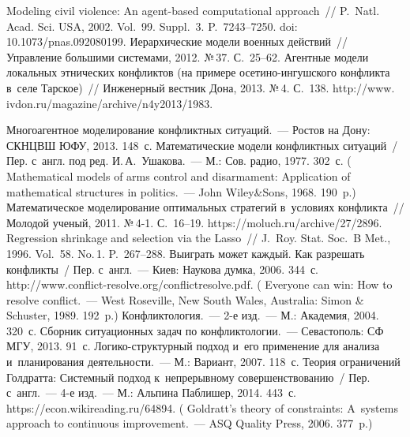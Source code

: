 \begin{multicols}{2}
{{\begin{thebibliography}{99}
 Modeling civil violence: An agent-based 
computational approach~// P.~Natl. Acad. Sci. USA, 2002. Vol.~99. Suppl.~3. P.~7243--7250. doi: 
10.1073/pnas.092080199.
 Иерархические модели военных действий~// Управление большими 
системами, 2012. №\,37. С.~25--62.
 Агентные модели локальных этнических конфликтов (на 
примере осе\-ти\-но-ин\-гуш\-ско\-го конфликта в~селе Тарское)~// Инженерный вестник 
Дона, 2013. №\,4.  С.~138.
{\sf http://www. ivdon.ru/magazine/archive/n4y2013/1983}.

 Многоагентное моделирование конфликтных  
ситуаций.~--- Ростов на Дону: СКНЦВШ ЮФУ, 2013. 148~с.
 Математические модели конфликтных ситуаций~/ Пер. с~англ. под ред. 
И.\,А.~Ушакова.~--- М.: Сов. радио, 1977. 302~с. ( Mathematical models of arms 
control and disarmament: Application of mathematical structures in politics.~--- John Wiley\&Sons, 
1968. 190~p.)
 Математическое моделирование 
оптимальных стратегий в~условиях конфликта~// Молодой ученый, 2011.  \mbox{№\,4-1}.  
С.~16--19. {\sf https://moluch.ru/archive/27/2896.}
 Regression shrinkage and selection via the Lasso~// J.~Roy. 
Stat. Soc.~B Met., 1996. Vol.~58. No.\,1. P.~267--288.
 Выиграть может каждый. Как разрешать конфликты~/ Пер. 
с~англ.~--- Киев: Наукова думка, 2006. 344~с. {\sf  
http://www.conflict-resolve.org/conflictresolve.pdf}.
( Everyone can win: 
How to resolve conflict.~--- West Roseville, New South Wales, Australia: 
Simon \& Schuster, 1989. 192~p.)
 Конфликтология.~--- 
2-е изд.~--- М.: Академия, 2004. 320~с.
 Сборник ситуационных задач по 
конфликтологии.~--- Севастополь: СФ МГУ, 2013. 91~с.
 Ло\-ги\-ко-струк\-тур\-ный подход и~его применение для 
анализа и~планирования деятельности.~--- М.: Вариант, 2007. 118~с. 
 Теория ограничений Голдратта: Системный подход к~непрерывному 
совершенствованию~/ Пер. с~англ.~--- 4-е изд.~--- М.: Альпина Паблишер, 2014. 443~с. 
{\sf https://econ.wikireading.ru/64894}. ( Goldratt's theory of constraints: 
A~systems approach to continuous improvement.~--- ASQ Quality Press, 2006. 377~p.) 

 \end{thebibliography}

 }
 }

\end{multicols}

